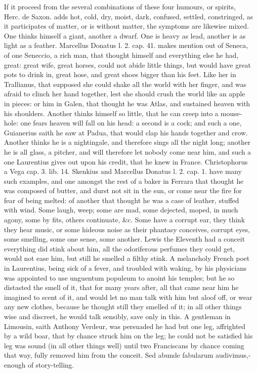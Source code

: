 {If it proceed from the several combinations of these four humours, or
spirits, Herc. de Saxon. adds hot, cold, dry, moist, dark, confused,
settled, constringed, as it participates of matter, or is without
matter, the symptoms are likewise mixed. One thinks himself a giant,
another a dwarf. One is heavy as lead, another is as light as a
feather. Marcellus Donatus l. 2. cap. 41. makes mention out of Seneca,
of one Seneccio, a rich man, that thought himself and everything
else he had, great: great wife, great horses, could not abide little
things, but would have great pots to drink in, great hose, and great
shoes bigger than his feet. Like her in Trallianus, that supposed
she could shake all the world with her finger, and was afraid to clinch
her hand together, lest she should crush the world like an apple in
pieces: or him in Galen, that thought he was Atlas, and sustained
heaven with his shoulders. Another thinks himself so little, that he
can creep into a mouse-hole: one fears heaven will fall on his head: a
second is a cock; and such a one, Guianerius saith he saw at
Padua, that would clap his hands together and crow. Another
thinks he is a nightingale, and therefore sings all the night long;
another he is all glass, a pitcher, and will therefore let nobody come
near him, and such a one Laurentius gives out upon his credit,
that he knew in France. Christophorus a Vega cap. 3. lib. 14. Skenkius
and Marcellus Donatus l. 2. cap. 1. have many such examples, and one
amongst the rest of a baker in Ferrara that thought he was composed of
butter, and durst not sit in the sun, or come near the fire for fear of
being melted: of another that thought he was a case of leather, stuffed
with wind. Some laugh, weep; some are mad, some dejected, moped, in
much agony, some by fits, others continuate, \&c. Some have a corrupt
ear, they think they hear music, or some hideous noise as their
phantasy conceives, corrupt eyes, some smelling, some one sense, some
another. Lewis the Eleventh had a conceit everything did stink
about him, all the odoriferous perfumes they could get, would not ease
him, but still he smelled a filthy stink. A melancholy French poet in
Laurentius, being sick of a fever, and troubled with waking, by
his physicians was appointed to use unguentum populeum to anoint his
temples; but he so distasted the smell of it, that for many years
after, all that came near him he imagined to scent of it, and would let
no man talk with him but aloof off, or wear any new clothes, because he
thought still they smelled of it; in all other things wise and
discreet, he would talk sensibly, save only in this. A gentleman in
Limousin, saith Anthony Verdeur, was persuaded he had but one leg,
affrighted by a wild boar, that by chance struck him on the leg; he
could not be satisfied his leg was sound (in all other things well)
until two Franciscans by chance coming that way, fully removed him from
the conceit. Sed abunde fabularum audivimus,-enough of story-telling.

}
